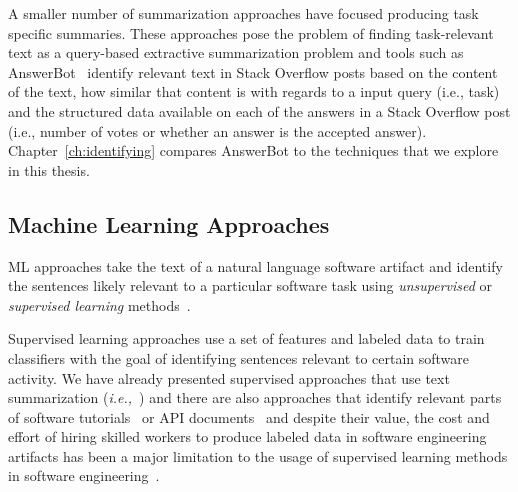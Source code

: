 A smaller number of summarization approaches have focused
producing task specific summaries.
These approaches pose the problem of finding task-relevant text 
as a query-based extractive summarization problem and
tools such as AnswerBot~\cite{Xu2017}
identify relevant text in Stack Overflow posts 
based on 
the content of the text, how similar that content is with regards to a input query (i.e., task)
and the structured data available on each of the answers in a Stack Overflow post 
(i.e., number of votes or whether an answer is the accepted answer).
Chapter~\ref{ch:identifying}
compares AnswerBot to the techniques that we explore in this thesis.



\subsection{Machine Learning Approaches}
\label{cp2:machine-learning}


\acf{ML} approaches take the text of a natural language software artifact and identify 
the sentences likely relevant to a particular software task using \textit{unsupervised} or 
\textit{supervised learning} methods~\cite{zhang2005machine}.



Supervised learning approaches use a set of features and labeled data
 to train classifiers with the goal of identifying sentences relevant to 
 certain software activity.
We have already presented supervised approaches that use text summarization (\textit{i.e.,}~\cite{Rastkar2010})
and there are also approaches that identify relevant 
parts of software tutorials~\cite{Jiang2016b}
or API documents~\cite{fucci2019, Maalej2013}
and despite their value, 
the cost and effort of hiring skilled workers to produce 
labeled data in software engineering artifacts 
has been a major limitation 
to the usage of supervised learning 
methods in software engineering~\cite{aa}.





